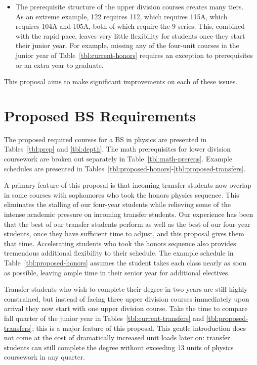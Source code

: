 \documentclass[12pt]{article}
\begin{document}
\begin{itemize}
\item The prerequisite structure of the upper division courses creates
  many tiers.  As an extreme example, 122 requires 112, which requires
  115A, which requires 104A and 105A, both of which require the 9
  series.  This, combined with the rapid pace, leaves very little
  flexibility for students once they start their junior year.  For
  example, missing any of the four-unit courses in the junior year of
  Table~\ref{tbl:current-honors} requires an exception to
  prerequisites or an extra year to graduate.
\end{itemize}
This proposal aims to make significant improvements on each of these issues.

\newpage

\section{Proposed BS Requirements}

The proposed required courses for a BS in physics are presented in
Tables~\ref{tbl:prep} and \ref{tbl:depth}.  The math prerequisites for
lower division coursework are broken out separately in
Table~\ref{tbl:math-prereqs}.  Example schedules are presented in
Tables~\ref{tbl:proposed-honors}-\ref{tbl:proposed-transfers}.

A primary feature of this proposal is that incoming transfer students
now overlap in some courses with sophomores who took the honors
physics sequence.  This eliminates the stalling of our four-year
students while relieving some of the intense academic pressure on
incoming transfer students.  Our experience has been that the best of
our transfer students perform as well as the best of our four-year
students, once they have sufficient time to adjust, and this proposal
gives them that time.  Accelerating students who took the honors
sequence also provides tremendous additional flexibility to their
schedule.  The example schedule in Table~\ref{tbl:proposed-honors}
assumes the student takes each class nearly as soon as possible,
leaving ample time in their senior year for additional electives.

Transfer students who wish to complete their degree in two years are
still highly constrained, but instead of facing three upper division
courses immediately upon arrival they now start with one upper
division course.  Take the time to compare fall quarter of the junior
year in Tables~\ref{tbl:current-transfers} and
\ref{tbl:proposed-transfers}; this is a major feature of this
proposal.  This gentle introduction does not come at the cost of
dramatically increased unit loads later on: transfer students can
still complete the degree without exceeding 13 units of physics
coursework in any quarter.
\end{document}
